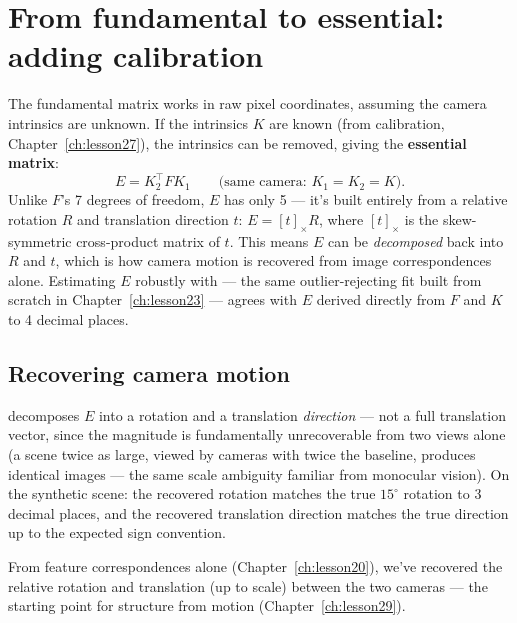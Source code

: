 \section{From fundamental to essential: adding calibration}

The fundamental matrix works in raw pixel coordinates, assuming the camera intrinsics are unknown. If the intrinsics $K$ are known (from calibration, Chapter~\ref{ch:lesson27}), the intrinsics can be removed, giving the \textbf{essential matrix}:
\begin{equation}
E = K_2^\top F K_1 \qquad \text{(same camera: } K_1=K_2=K\text{)}.
\end{equation}
Unlike $F$'s 7 degrees of freedom, $E$ has only 5 --- it's built entirely from a relative rotation $R$ and translation direction $t$: $E=[t]_\times R$, where $[t]_\times$ is the skew-symmetric cross-product matrix of $t$. This means $E$ can be \emph{decomposed} back into $R$ and $t$, which is how camera motion is recovered from image correspondences alone. Estimating $E$ robustly with  --- the same outlier-rejecting fit built from scratch in Chapter~\ref{ch:lesson23} --- agrees with $E$ derived directly from $F$ and $K$ to 4 decimal places.

\subsection*{Recovering camera motion}

 decomposes $E$ into a rotation and a translation \emph{direction} --- not a full translation vector, since the magnitude is fundamentally unrecoverable from two views alone (a scene twice as large, viewed by cameras with twice the baseline, produces identical images --- the same scale ambiguity familiar from monocular vision). On the synthetic scene: the recovered rotation matches the true $15^\circ$ rotation to 3 decimal places, and the recovered translation direction matches the true direction up to the expected sign convention.

From feature correspondences alone (Chapter~\ref{ch:lesson20}), we've recovered the relative rotation and translation (up to scale) between the two cameras --- the starting point for structure from motion (Chapter~\ref{ch:lesson29}).

